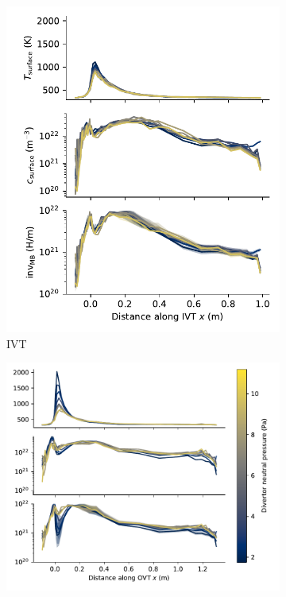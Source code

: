 \begin{figure}[h!]
    \captionsetup[subfigure]{format=plain,singlelinecheck=true}  %
    \centering
    \begin{subfigure}{0.42\linewidth}
        \includegraphics[width=\linewidth]{Figures/Chapter4/ITER/inventory_along_inner_divertor.pdf}
        \caption{IVT}
    \end{subfigure}%
    \begin{subfigure}{0.58\linewidth}
        \includegraphics[width=\linewidth]{Figures/Chapter4/ITER/inventory_along_outer_divertor.pdf}

\end{subfigure}
\end{figure}
